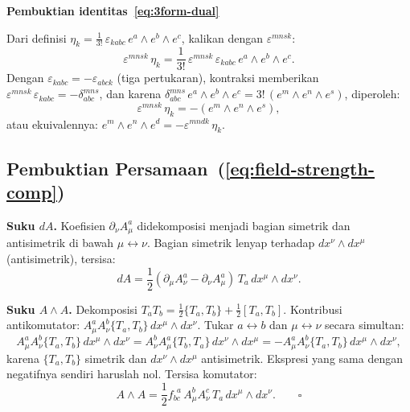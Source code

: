 \vspace{0.5em}
\noindent \textbf{Pembuktian identitas~\eqref{eq:3form-dual}}

Dari definisi $\eta_k = \frac{1}{3!}\, \varepsilon_{kabc}\, e^a \wedge e^b \wedge e^c$, kalikan dengan $\varepsilon^{mnsk}$:
\begin{equation}
    \varepsilon^{mnsk}\, \eta_k = \frac{1}{3!}\, \varepsilon^{mnsk}\, \varepsilon_{kabc}\, e^a \wedge e^b \wedge e^c.
\end{equation}
Dengan $\varepsilon_{kabc} = -\varepsilon_{abck}$ (tiga pertukaran), kontraksi memberikan $\varepsilon^{mnsk}\, \varepsilon_{kabc} = -\delta^{mns}_{abc}$, dan karena $\delta^{mns}_{abc}\, e^a \wedge e^b \wedge e^c = 3!\,(e^m \wedge e^n \wedge e^s)$, diperoleh:
\begin{equation}
    \varepsilon^{mnsk}\, \eta_k = -(e^m \wedge e^n \wedge e^s),
\end{equation}
atau ekuivalennya: $e^m \wedge e^n \wedge e^d = -\varepsilon^{mndk}\, \eta_k$.

\subsection{Pembuktian Persamaan~(\ref{eq:field-strength-comp})}
\label{app:proof-F-comp}
 
\noindent\textbf{Suku $dA$.} Koefisien $\partial_\nu A^a_\mu$ didekomposisi menjadi bagian simetrik dan antisimetrik di bawah $\mu \leftrightarrow \nu$. Bagian simetrik lenyap terhadap $dx^\nu \wedge dx^\mu$ (antisimetrik), tersisa:
\begin{equation}
    dA = \frac{1}{2}(\partial_\mu A^a_\nu - \partial_\nu A^a_\mu)\,T_a\,dx^\mu \wedge dx^\nu.
\end{equation}
 
\noindent\textbf{Suku $A \wedge A$.} Dekomposisi $T_a T_b = \frac{1}{2}\{T_a,T_b\} + \frac{1}{2}[T_a,T_b]$. Kontribusi antikomutator: $A^a_\mu A^b_\nu\{T_a,T_b\}\,dx^\mu \wedge dx^\nu$. Tukar $a \leftrightarrow b$ dan $\mu \leftrightarrow \nu$ secara simultan:
\begin{equation}
    A^a_\mu A^b_\nu\{T_a,T_b\}\,dx^\mu \wedge dx^\nu = A^b_\nu A^a_\mu\{T_b,T_a\}\,dx^\nu \wedge dx^\mu = -A^a_\mu A^b_\nu\{T_a,T_b\}\,dx^\mu \wedge dx^\nu,
\end{equation}
karena $\{T_a,T_b\}$ simetrik dan $dx^\nu \wedge dx^\mu$ antisimetrik. Ekspresi yang sama dengan negatifnya sendiri haruslah nol. Tersisa komutator:
\begin{equation}
    A \wedge A = \frac{1}{2}f_{bc}^{\ \ a}\,A^b_\mu A^c_\nu\,T_a\,dx^\mu \wedge dx^\nu. \qquad\square
\end{equation}
 

